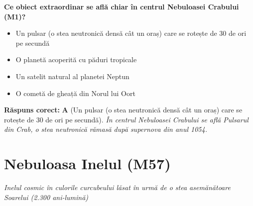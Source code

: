 \vspace{6pt}
\begin{tcolorbox}[orbitarquiz, title={\textbf{Întrebare de verificare \#68: Nebuloasa Crabului (M1)}}]
\textbf{Ce obiect extraordinar se află chiar în centrul Nebuloasei Crabului (M1)?}
\begin{itemize}[leftmargin=2.2em, itemsep=2pt, topsep=4pt]
  \item[$\square$ \textbf{A.}] Un pulsar (o stea neutronică densă cât un oraș) care se rotește de 30 de ori pe secundă
  \item[$\square$ \textbf{B.}] O planetă acoperită cu păduri tropicale
  \item[$\square$ \textbf{C.}] Un satelit natural al planetei Neptun
  \item[$\square$ \textbf{D.}] O cometă de gheață din Norul lui Oort
\end{itemize}
\vspace{2pt}
{\footnotesize\color{orbitarMuted}\textbf{Răspuns corect:} \textbf{A} (Un pulsar (o stea neutronică densă cât un oraș) care se rotește de 30 de ori pe secundă). \emph{În centrul Nebuloasei Crabului se află Pulsarul din Crab, o stea neutronică rămasă după supernova din anul 1054.}}
\end{tcolorbox}
\clearpage


\section{Nebuloasa Inelul (M57)}
\label{sec:body-ring_nebula}
\vspace{-4pt}
{\large\itshape\color{orbitarAccent} Inelul cosmic în culorile curcubeului lăsat în urmă de o stea asemănătoare Soarelui (2.300 ani-lumină)}\\[4pt]



